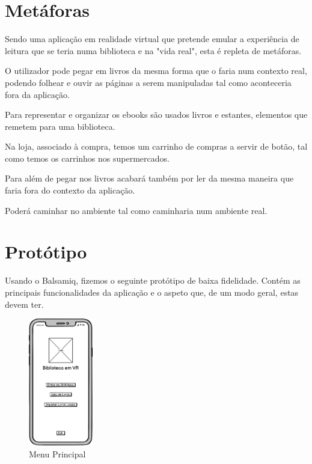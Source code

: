 \documentclass[11pt]{article}
\begin{document}
	\large
	\section{Metáforas}
	\normalsize
	
	Sendo uma aplicação em realidade virtual que pretende emular a experiência de leitura que se teria numa biblioteca e na "vida real", esta é repleta de metáforas.
	
	O utilizador pode pegar em livros da mesma forma que o faria num contexto real, podendo folhear e ouvir as páginas a serem manipuladas tal como aconteceria fora da aplicação.
	
	Para representar e organizar os ebooks são usados livros e estantes, elementos que remetem para uma biblioteca.
	
	Na loja, associado à compra, temos um carrinho de compras a servir de botão, tal como temos os carrinhos nos supermercados.
	
	Para além de pegar nos livros acabará também por ler da mesma maneira que faria fora do contexto da aplicação.
	
	Poderá caminhar no ambiente tal como caminharia num ambiente real.
	
	
	\large
	\section{Protótipo}
	\normalsize
	
	Usando o Balsamiq, fizemos o seguinte protótipo de baixa fidelidade. Contém as principais funcionalidades da aplicação e o aspeto que, de um modo geral, estas devem ter.
	
	\begin{figure}[H]
		\includegraphics[width=0.25\textwidth,height=0.88\textheight,keepaspectratio]{main-menu}
		\centering
		\caption{Menu Principal}
		\label{fig:menu}
	\end{figure}
\end{document}
